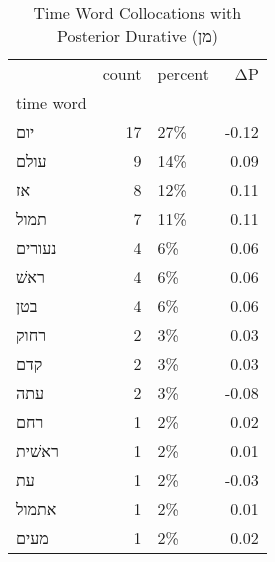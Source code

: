 \begin{table}[htbp!]
\centering
\caption{Time Word Collocations with Posterior Durative (מן)}
\label{table:postdurמן_head_cpd}
\begin{tabular}{lrlr}
\toprule
{} &  count & percent &    ΔP \\
time word &        &         &       \\
\midrule
יום       &     17 &     27\% & -0.12 \\
עולם      &      9 &     14\% &  0.09 \\
אז        &      8 &     12\% &  0.11 \\
תמול      &      7 &     11\% &  0.11 \\
נעורים    &      4 &      6\% &  0.06 \\
ראשׁ      &      4 &      6\% &  0.06 \\
בטן       &      4 &      6\% &  0.06 \\
רחוק      &      2 &      3\% &  0.03 \\
קדם       &      2 &      3\% &  0.03 \\
עתה       &      2 &      3\% & -0.08 \\
רחם       &      1 &      2\% &  0.02 \\
ראשׁית    &      1 &      2\% &  0.01 \\
עת        &      1 &      2\% & -0.03 \\
אתמול     &      1 &      2\% &  0.01 \\
מעים      &      1 &      2\% &  0.02 \\
\bottomrule
\end{tabular}
\end{table}
